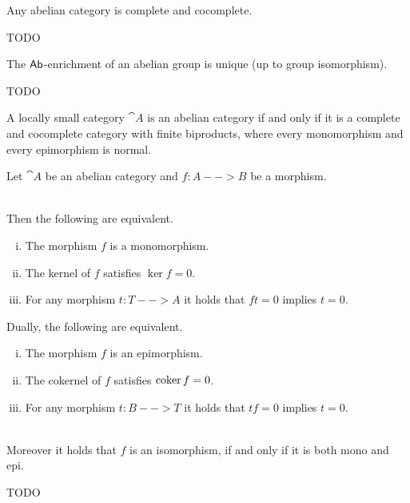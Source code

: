 	\begin{corollary}
		Any abelian category is complete and cocomplete.
	\end{corollary}
	\begin{sketch}
		TODO
	\end{sketch}

	\begin{theorem}
		The $\textsf{Ab}$-enrichment of an abelian group is unique (up to group isomorphism).
	\end{theorem}
	\begin{sketch}
		TODO
	\end{sketch}

	\begin{corollary}
		A locally small category $\cat{A}$ is an abelian category if and only if it is a complete and cocomplete category with finite biproducts, where every monomorphism and every epimorphism is normal.
	\end{corollary}

	\begin{proposition}
		Let $\cat{A}$ be an abelian category and $f:A-->B$ be a morphism.
		
		~\\
		Then the following are equivalent.
		\begin{enumerate}[(i)]
			\item{
				The morphism $f$ is a monomorphism.
			}
			\item{
				The kernel of $f$ satisfies $\ker f = 0$.
			}
			\item{
				For any morphism $t:T-->A$ it holds that $ft = 0$ implies $t = 0$.
			}
		\end{enumerate}
		Dually, the following are equivalent.
		\begin{enumerate}[(i)]
			\item{
				The morphism $f$ is an epimorphism.
			}
			\item{
				The cokernel of $f$ satisfies $\operatorname{coker} f = 0$.
			}
			\item{
				For any morphism $t:B-->T$ it holds that $tf = 0$ implies $t = 0$.
			}
		\end{enumerate}

		~\\
		Moreover it holds that $f$ is an isomorphism, if and only if it is both mono and epi.
	\end{proposition}
	\begin{sketch}
		TODO
	\end{sketch}


